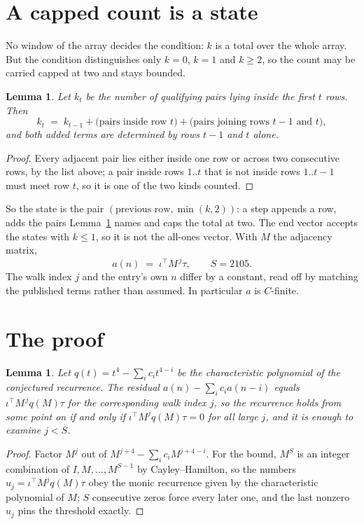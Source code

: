 \documentclass[11pt,a4paper]{article}
\theoremstyle{plain}
\newtheorem{lemma}[theorem]{Lemma}
\theoremstyle{definition}
\begin{document}
\section{A capped count is a state}

No window of the array decides the condition: $k$ is a total over the whole array. But the
condition distinguishes only $k=0$, $k=1$ and $k\ge2$, so the count may be carried capped at
two and stays bounded.

\begin{lemma}\label{lem:cap}
Let $k_t$ be the number of qualifying pairs lying inside the first $t$ rows. Then
\[
k_{t}\;=\;k_{t-1}+\bigl(\text{pairs inside row } t\bigr)
+\bigl(\text{pairs joining rows } t-1 \text{ and } t\bigr),
\]
and both added terms are determined by rows $t-1$ and $t$ alone.
\end{lemma}

\begin{proof}
Every adjacent pair lies either inside one row or across two consecutive rows, by the list
above; a pair inside rows $1..t$ that is not inside rows $1..t-1$ must meet row $t$, so it is
one of the two kinds counted.
\end{proof}

So the state is the pair $(\text{previous row},\min(k,2))$: a step appends a row, adds the
pairs Lemma~\ref{lem:cap} names and caps the total at two. The end vector accepts the states
with $k\le1$, so it is not the all-ones vector. With $M$ the adjacency matrix,
\[
a(n)\;=\;\iota^{\!\top}M^{\,j}\tau ,\qquad S=2105.
\]
The walk index $j$ and the entry's own $n$ differ by a constant, read off by matching the
published terms rather than assumed. In particular $a$ is $C$-finite.

\section{The proof}

\begin{lemma}\label{lem:crit}
Let $q(t)=t^{4}-\sum_i c_it^{4-i}$ be the characteristic polynomial of the
conjectured recurrence. The residual $a(n)-\sum_ic_ia(n-i)$ equals
$\iota^{\!\top}M^{\,j}q(M)\tau$ for the corresponding walk index $j$, so the recurrence
holds from some point on if and only if $\iota^{\!\top}M^{j}q(M)\tau=0$ for all large $j$,
and it is enough to examine $j<S$.
\end{lemma}

\begin{proof}
Factor $M^{j}$ out of $M^{j+4}-\sum_ic_iM^{j+4-i}$. For the bound, $M^{S}$
is an integer combination of $I,M,\dots,M^{S-1}$ by Cayley--Hamilton, so the numbers
$u_j=\iota^{\!\top}M^{j}q(M)\tau$ obey the monic recurrence given by the characteristic
polynomial of $M$; $S$ consecutive zeros force every later one, and the last nonzero $u_j$
pins the threshold exactly.
\end{proof}
\end{document}
